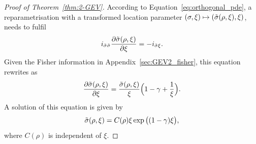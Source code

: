 \documentclass{article}
\newcommand{\1}{\mathds{1}}
\theoremstyle{definition}
\begin{document}
\begin{proof}[Proof of Theorem~\ref{thm:2-GEV}]
    According to Equation~\eqref{eq:orthogonal_pde}, a reparametrisation with a transformed location parameter $(\sigma,\xi) \mapsto (\Tilde{\sigma}(\rho,\xi),\xi)$, needs to fulfil
    \begin{equation*}
        i_{\Tilde{\sigma}\Tilde{\sigma}} \frac{\partial \Tilde{\sigma}(\rho,\xi)}{\partial \xi}= - i_{\Tilde{\sigma}\xi}.
    \end{equation*}
   Given the Fisher information in Appendix~\ref{sec:GEV2_fisher}, this equation rewrites as
    \begin{equation*}
        \frac{\partial \Tilde{\sigma}(\rho,\xi)}{\partial \xi}=  \frac{\Tilde{\sigma}(\rho,\xi)}{\xi}\Big(1-\gamma+\frac{1}{\xi}\Big).
    \end{equation*}
    A solution of this equation is given by
    \begin{equation*}
        \Tilde{\sigma}(\rho,\xi) = C(\rho)\xi\exp\big((1-\gamma)\xi\big),
    \end{equation*}
    where $C(\rho)$ is independent of $\xi$.
\end{proof}
    
\end{document}
